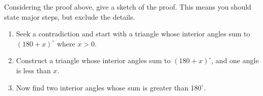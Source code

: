 \documentclass[noauthor,nooutcomes,12pt,hints,newpage,handout]{ximera}
\begin{document}
\begin{problem}
Considering the proof above, give a sketch of the proof. This means
you should state major steps, but exclude the details.

\begin{freeResponse}
  \begin{enumerate}
  \item Seek a contradiction and start with a triangle whose
    interior angles sum to $(180+x)^\circ$ where $x>0$.
  \item Construct a triangle whose interior angles sum to
    $(180+x)^\circ$, and one angle is less than $x$.
  \item Now find two interior angles whose sum is greater than
    $180^\circ$.
  \end{enumerate}
\end{freeResponse}

\end{problem}



\end{document}
